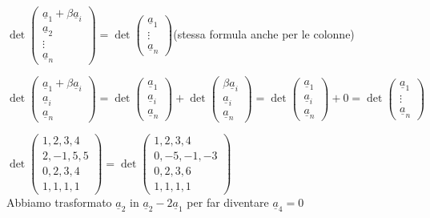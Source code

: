 \begin{corollario}
	\phantom{text}\\
	$\det\begin{pmatrix}
		\underline{a}_1+\beta\underline{a}_i\\
		\underline{a}_2\\
		\vdots\\
		\underline{a}_n
	\end{pmatrix}=\det\begin{pmatrix}
		\underline{a}_1\\
		\vdots\\
		\underline{a}_n
	\end{pmatrix}$(stessa formula anche per le colonne)
	\begin{dimostrazione}
		$\det\begin{pmatrix}
			\underline{a}_1+\beta\underline{a}_i\\
			\underline{a}_i\\
			\underline{a}_n
		\end{pmatrix}=\det\begin{pmatrix}
			\underline{a}_1\\
			\underline{a}_i\\
			\underline{a}_n
		\end{pmatrix}+\det\begin{pmatrix}
			\beta\underline{a}_i\\
			\underline{a}_i\\
			\underline{a}_n
		\end{pmatrix}=\det\begin{pmatrix}
			\underline{a}_1\\
			\underline{a}_i\\
			\underline{a}_n
		\end{pmatrix}+0=\det\begin{pmatrix}
			\underline{a}_1\\
			\vdots\\
			\underline{a}_n
		\end{pmatrix}$
	\end{dimostrazione}
	\begin{es}
		$\det\begin{pmatrix}
			1, 2, 3, 4\\
			2, -1, 5, 5\\
			0, 2, 3 ,4\\
			1, 1, 1, 1
		\end{pmatrix}=\det\begin{pmatrix}
			1, 2, 3, 4\\
			0, -5, -1, -3\\
			0, 2, 3, 6\\
			1, 1, 1, 1
		\end{pmatrix}$\\
		Abbiamo trasformato $\underline{a}_2$ in $\underline{a}_2-2\underline{a}_1$  per far diventare $\underline{a}_4=0$
	\end{es}
\end{corollario}















